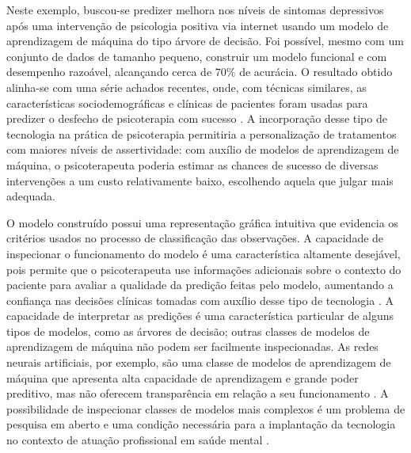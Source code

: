 Neste exemplo, buscou-se predizer melhora nos níveis de sintomas depressivos após uma intervenção de psicologia positiva via internet usando um modelo de aprendizagem de máquina do tipo árvore de
decisão. Foi possível, mesmo com um conjunto de dados de tamanho pequeno, construir um modelo funcional e com desempenho razoável, alcançando cerca de $70\%$ de acurácia. O resultado obtido alinha-se
com uma série achados recentes, onde, com técnicas similares, as características sociodemográficas e clínicas de pacientes foram usadas para predizer o desfecho de psicoterapia com sucesso \cite{Collins2023, Hornstein2021}.
A incorporação desse tipo de tecnologia na prática de psicoterapia permitiria a personalização de tratamentos com maiores níveis de assertividade: com auxílio de modelos de aprendizagem de máquina, o
psicoterapeuta poderia estimar as chances de sucesso de diversas intervenções a um custo relativamente baixo, escolhendo aquela que julgar mais adequada.

O modelo construído possui uma representação gráfica intuitiva que evidencia os critérios usados no processo de classificação das observações. A capacidade de inspecionar o funcionamento do modelo
é uma característica altamente desejável, pois permite que o psicoterapeuta use informações adicionais sobre o contexto do paciente para avaliar a qualidade da predição feitas pelo modelo, aumentando
a confiança nas decisões clínicas tomadas com auxílio desse tipo de tecnologia \cite{Stiglic2020, WHO2023}. A capacidade de interpretar as predições é uma característica particular de alguns tipos de modelos,
como as árvores de decisão; outras classes de modelos de aprendizagem de máquina não podem ser facilmente inspecionadas. As redes neurais artificiais, por exemplo, são uma classe de modelos de aprendizagem
de máquina que apresenta alta capacidade de aprendizagem e grande poder preditivo, mas não oferecem transparência em relação a seu funcionamento \cite{Stiglic2020}. A possibilidade de inspecionar classes
de modelos mais complexos é um problema de pesquisa em aberto e uma condição necessária para a implantação da tecnologia no contexto de atuação profissional em saúde mental \cite{Stiglic2020, WHO2023}.

